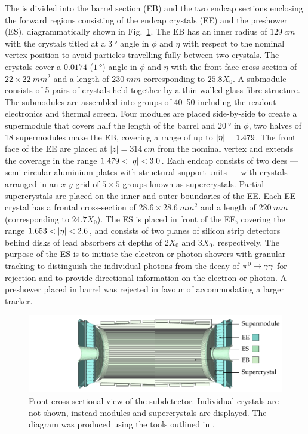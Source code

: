 The \ECAL is divided into the barrel section (EB) and the two endcap sections
enclosing the forward regions consisting of the endcap crystals (EE) and the
preshower (ES), diagrammatically shown in Fig.~\ref{fig:cms-ecal}. The EB has an inner
radius of ${\SI{129}{cm}}$ with the crystals titled at a ${\SI{3}{\degree}}$
angle in $\phi$ and $\eta$ with respect to the nominal vertex position to
avoid particles travelling fully between two crystals. The crystals cover a
$0.0174$ (${\SI{1}{\degree}}$) angle in $\phi$ and $\eta$ with the front face
cross-section of ${22\times\SI{22}{mm^{2}}}$ and a length of ${\SI{230}{mm}}$
corresponding to $25.8X_0$. A submodule consists of 5 pairs of crystals held
together by a thin-walled glass-fibre structure. The submodules are assembled
into groups of 40--50 including the readout electronics and thermal screen.
Four modules are placed side-by-side to create a supermodule that covers half
the length of the barrel and ${\SI{20}{\degree}}$ in $\phi$, two halves of 18
supermodules make the EB, covering a range of up to ${|\eta|=1.479}$. The front
face of the EE are placed at ${|z|=\SI{314}{cm}}$ from the nominal vertex and
extends the \ECAL coverage in the range ${1.479<\aeta<3.0}$. Each endcap
consists of two dees --- semi-circular aluminium plates with structural
support units --- with crystals arranged in an $x$-$y$ grid of $5\times 5$
groups known as supercrystals. Partial supercrystals are placed on the inner
and outer boundaries of the EE. Each EE crystal has a frontal cross-section
of ${28.6\times\SI{28.6}{mm^{2}}}$ and a length of ${\SI{220}{mm}}$
(corresponding to $24.7X_0$). The ES is placed in front of the EE, covering
the range $1.653<\aeta<2.6$, and consists of two planes of silicon strip
detectors behind disks of lead absorbers at depths of $2X_0$ and $3X_0$,
respectively. The purpose of the ES is to initiate the electron or photon
showers with granular tracking to distinguish the individual photons from the
decay of ${\pi^{0}\rightarrow\gamma\gamma}$ for rejection and to provide directional
information on the electron or photon. A preshower placed in barrel was
rejected in favour of accommodating a larger tracker.

\begin{figure}[htbp]
    \centering
    \includegraphics{diagrams/tikz/cms/annotated/cms_ecal.pdf}
    \caption{
        Front cross-sectional view of the \ECAL subdetector. Individual
        crystals are not shown, instead modules and supercrystals are
        displayed. The diagram was produced using the tools outlined in
        \cite{Sakuma:2013jqa}.
    }
    \label{fig:cms-ecal}
\end{figure}

